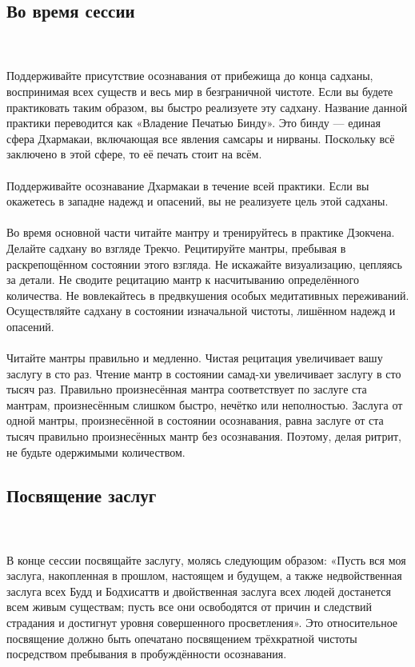 \subsection{Во время сессии}
\\ \\ Поддерживайте присутствие осознавания от прибежища до конца садханы, воспринимая всех существ и весь мир в безграничной чистоте. Если вы будете практиковать таким образом, вы быстро реализуете эту садхану. Название данной практики переводится как «Владение Печатью Бинду». Это бинду — единая сфера Дхармакаи, включающая все явления самсары и нирваны. Поскольку всё заключено в этой сфере, то её печать стоит на всём.
\\ \\ Поддерживайте осознавание Дхармакаи в течение всей практики. Если вы окажетесь в западне надежд и опасений, вы не реализуете цель этой садханы.
\\ \\ Во время основной части читайте мантру и тренируйтесь в практике Дзокчена. Делайте садхану во взгляде Трекчо. Рецитируйте мантры, пребывая в раскрепощённом состоянии этого взгляда. Не искажайте визуализацию, цепляясь за детали. Не сводите рецитацию мантр к насчитыванию определённого количества. Не вовлекайтесь в предвкушения особых медитативных переживаний. Осуществляйте садхану в состоянии изначальной чистоты, лишённом надежд и опасений.
\\ \\ Читайте мантры правильно и медленно. Чистая рецитация увеличивает вашу заслугу в сто раз. Чтение мантр в состоянии самад-хи увеличивает заслугу в сто тысяч раз. Правильно произнесённая мантра соответствует по заслуге ста мантрам, произнесённым слишком быстро, нечётко или неполностью. Заслуга от одной мантры, произнесённой в состоянии осознавания, равна заслуге от ста тысяч правильно произнесённых мантр без осознавания. Поэтому, делая ритрит, не будьте одержимыми количеством.
\subsection{Посвящение заслуг}
\\ \\ В конце сессии посвящайте заслугу, молясь следующим образом: «Пусть вся моя заслуга, накопленная в прошлом, настоящем и будущем, а также недвойственная заслуга всех Будд и Бодхисаттв и двойственная заслуга всех людей достанется всем живым существам; пусть все они освободятся от причин и следствий страдания и достигнут уровня совершенного просветления». Это относительное посвящение должно быть опечатано посвящением трёхкратной чистоты посредством пребывания в пробуждённости осознавания.

